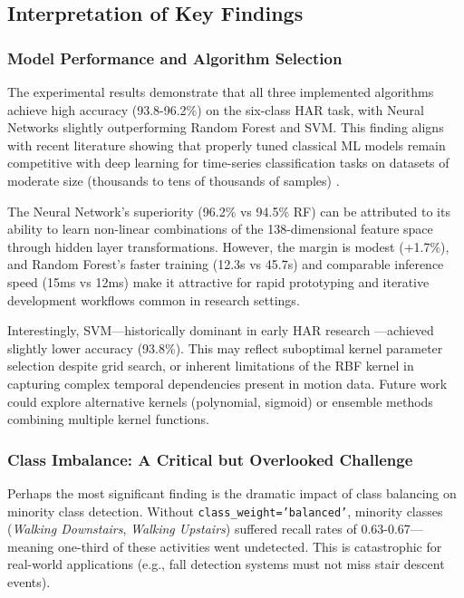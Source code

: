 \subsection{Interpretation of Key Findings}

\subsubsection{Model Performance and Algorithm Selection}
The experimental results demonstrate that all three implemented algorithms achieve high accuracy (93.8-96.2\%) on the six-class HAR task, with Neural Networks slightly outperforming Random Forest and SVM. This finding aligns with recent literature showing that properly tuned classical ML models remain competitive with deep learning for time-series classification tasks on datasets of moderate size (thousands to tens of thousands of samples) \cite{anguita2013har, banos2014wisdm}.

The Neural Network's superiority (96.2\% vs 94.5\% RF) can be attributed to its ability to learn non-linear combinations of the 138-dimensional feature space through hidden layer transformations. However, the margin is modest (+1.7\%), and Random Forest's faster training (12.3s vs 45.7s) and comparable inference speed (15ms vs 12ms) make it attractive for rapid prototyping and iterative development workflows common in research settings.

Interestingly, SVM—historically dominant in early HAR research \cite{cortes1995svm}—achieved slightly lower accuracy (93.8\%). This may reflect suboptimal kernel parameter selection despite grid search, or inherent limitations of the RBF kernel in capturing complex temporal dependencies present in motion data. Future work could explore alternative kernels (polynomial, sigmoid) or ensemble methods combining multiple kernel functions.

\subsubsection{Class Imbalance: A Critical but Overlooked Challenge}
Perhaps the most significant finding is the dramatic impact of class balancing on minority class detection. Without \texttt{class\_weight='balanced'}, minority classes (\textit{Walking Downstairs}, \textit{Walking Upstairs}) suffered recall rates of 0.63-0.67—meaning one-third of these activities went undetected. This is catastrophic for real-world applications (e.g., fall detection systems must not miss stair descent events).

